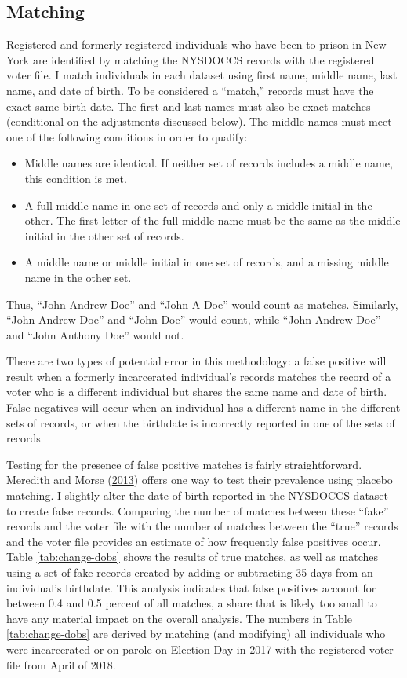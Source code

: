 \documentclass[12pt,]{article}
\providecommand{\tightlist}{%
  \setlength{\itemsep}{0pt}\setlength{\parskip}{0pt}}
\begin{document}
\hypertarget{matching}{%
\subsection*{Matching}\label{matching}}

Registered and formerly registered individuals who have been to prison in New York are identified by matching the NYSDOCCS records with the registered voter file. I match individuals in each dataset using first name, middle name, last name, and date of birth. To be considered a ``match,'' records must have the exact same birth date. The first and last names must also be exact matches (conditional on the adjustments discussed below). The middle names must meet one of the following conditions in order to qualify:

\begin{itemize}
\tightlist
\item
  Middle names are identical. If neither set of records includes a middle name, this condition is met.
\item
  A full middle name in one set of records and only a middle initial in the other. The first letter of the full middle name must be the same as the middle initial in the other set of records.
\item
  A middle name or middle initial in one set of records, and a missing middle name in the other set.
\end{itemize}

Thus, ``John Andrew Doe'' and ``John A Doe'' would count as matches. Similarly, ``John Andrew Doe'' and ``John Doe'' would count, while ``John Andrew Doe'' and ``John Anthony Doe'' would not.

There are two types of potential error in this methodology: a false positive will result when a formerly incarcerated individual's records matches the record of a voter who is a different individual but shares the same name and date of birth. False negatives will occur when an individual has a different name in the different sets of records, or when the birthdate is incorrectly reported in one of the sets of records

Testing for the presence of false positive matches is fairly straightforward. Meredith and Morse (\protect\hyperlink{ref-Meredith2013}{2013}) offers one way to test their prevalence using placebo matching. I slightly alter the date of birth reported in the NYSDOCCS dataset to create false records. Comparing the number of matches between these ``fake'' records and the voter file with the number of matches between the ``true'' records and the voter file provides an estimate of how frequently false positives occur. Table \ref{tab:change-dobs} shows the results of true matches, as well as matches using a set of fake records created by adding or subtracting 35 days from an individual's birthdate. This analysis indicates that false positives account for between 0.4 and 0.5 percent of all matches, a share that is likely too small to have any material impact on the overall analysis. The numbers in Table \ref{tab:change-dobs} are derived by matching (and modifying) all individuals who were incarcerated or on parole on Election Day in 2017 with the registered voter file from April of 2018.
\end{document}
